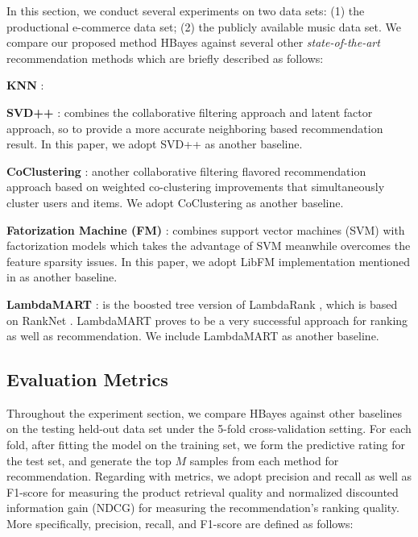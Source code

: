 In this section, we conduct several experiments on two data sets: (1) the productional e-commerce data set; (2) the publicly available music data set.  We compare our proposed method HBayes against several other \emph{state-of-the-art} recommendation methods which are briefly described as follows:

\textbf{KNN} \cite{koren2010factor}:

\textbf{SVD++} \cite{mnih2008probabilistic, koren2008factorization}: combines the collaborative filtering approach and latent factor approach, so to provide a more accurate neighboring based recommendation result.  In this paper, we adopt SVD++ as another baseline.

\textbf{CoClustering} \cite{george2005scalable}: another collaborative filtering flavored recommendation approach based on weighted co-clustering improvements that simultaneously cluster users and items.  We adopt CoClustering as another baseline.

\textbf{Fatorization Machine (FM)} \cite{rendle2010factorization}: combines support vector machines (SVM) with factorization models which takes the advantage of SVM meanwhile overcomes the feature sparsity issues.  In this paper, we adopt LibFM implementation mentioned in \cite{rendle2012factorization} as another baseline.

\textbf{LambdaMART} \cite{burges2010ranknet}: is the boosted tree version of LambdaRank \cite{donmez2009local}, which is based on RankNet \cite{burges2005learning}.  LambdaMART proves to be a very successful approach for ranking as well as recommendation.  We include LambdaMART as another baseline. 

\subsection{Evaluation Metrics}
Throughout the experiment section, we compare HBayes against other baselines on the testing held-out data set under the 5-fold cross-validation setting.  For each fold, after fitting the model on the training set, we form the predictive rating for the test set, and generate the top $M$ samples from each method for recommendation.  Regarding with metrics, we adopt precision and recall as well as F1-score for measuring the product retrieval quality and normalized discounted information gain (NDCG) for measuring the recommendation's ranking quality.  More specifically, precision, recall, and F1-score are defined as follows:


